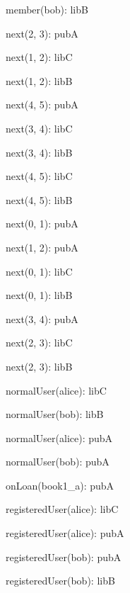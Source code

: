 \documentclass{article}
\newenvironment{states}
        {\begin{minipage}{\tableWidth}\raggedright\begin{description}[align=left,leftmargin=1em,noitemsep,labelsep=\parindent]}
        {\end{description}\end{minipage}}
\begin{document}
{\begin{states}
\item{{member(\allowbreak{}bob): libB}}
\item{{next(\allowbreak{}2, 3): pubA}}
\item{{next(\allowbreak{}1, 2): libC}}
\item{{next(\allowbreak{}1, 2): libB}}
\item{{next(\allowbreak{}4, 5): pubA}}
\item{{next(\allowbreak{}3, 4): libC}}
\item{{next(\allowbreak{}3, 4): libB}}
\item{{next(\allowbreak{}4, 5): libC}}
\item{{next(\allowbreak{}4, 5): libB}}
\item{{next(\allowbreak{}0, 1): pubA}}
\item{{next(\allowbreak{}1, 2): pubA}}
\item{{next(\allowbreak{}0, 1): libC}}
\item{{next(\allowbreak{}0, 1): libB}}
\item{{next(\allowbreak{}3, 4): pubA}}
\item{{next(\allowbreak{}2, 3): libC}}
\item{{next(\allowbreak{}2, 3): libB}}
\item{{normalUser(\allowbreak{}alice): libC}}
\item{{normalUser(\allowbreak{}bob): libB}}
\item{{normalUser(\allowbreak{}alice): pubA}}
\item{{normalUser(\allowbreak{}bob): pubA}}
\item{{onLoan(\allowbreak{}book1\_a): pubA}}
\item{{registeredUser(\allowbreak{}alice): libC}}
\item{{registeredUser(\allowbreak{}alice): pubA}}
\item{{registeredUser(\allowbreak{}bob): pubA}}
\item{{registeredUser(\allowbreak{}bob): libB}}
\end{states}}
\end{document}
